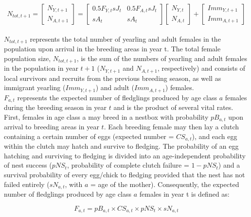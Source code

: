 \documentclass[
]{book}
\begin{document}
\hfill\break
\[N_{tot,t+1} = \begin{bmatrix} N_{Y,t+1} \\ N_{A,t+1} \end{bmatrix} =
  \begin{bmatrix}
0.5F_{Y,t}sJ_t & 0.5F_{A,t}sJ_t \\
sA_t & sA_t
\end{bmatrix}\begin{bmatrix} N_{Y,t} \\ N_{A,t} \end{bmatrix} +
  \begin{bmatrix} Imm_{Y,t+1} \\ Imm_{A,t+1} \end{bmatrix}\]\\

\(N_{tot,t+1}\) represents the total number of yearling and adult females in the
population upon arrival in the breeding areas in year t. The total female
population size, \(N_{tot,t+1}\), is the sum of the numbers of yearling and adult
females in the population in year \(t+1\) (\(N_{Y,t+1}\) and \(N_{A,t+1}\),
respectively) and consists of local survivors and recruits from the previous
breeding season, as well as immigrant yearling (\(Imm_{Y,t+1}\)) and adult
(\(Imm_{A,t+1}\)) females.\\

\(F_{a,t}\) represents the expected number of fledglings produced by age class \(a\)
females during the breeding season in year \(t\) and is the product of several
vital rates. First, females in age class a may breed in a nestbox with
probability \(pB_{a,t}\) upon arrival to breeding areas in year \(t\). Each breeding
female may then lay a clutch containing a certain number of eggs (expected
number = \(CS_{a,t}\)), and each egg within the clutch may hatch and survive to
fledging. The probability of an egg hatching and surviving to fledging is
divided into an age-independent probability of nest success (\(pNS_t\),
probability of complete clutch failure = \(1-pNS_t\)) and a survival probability
of every egg/chick to fledging provided that the nest has not failed entirely
(\(sN_{a,t}\), with \(a\) = age of the mother). Consequently, the expected number of
fledglings produced by age class \(a\) females in year t is defined as:

\begin{equation}
F_{a,t}= pB_{a,t}\times CS_{a,t}\times pNS_{t}\times sN_{a,t}
\end{equation}
\end{document}
